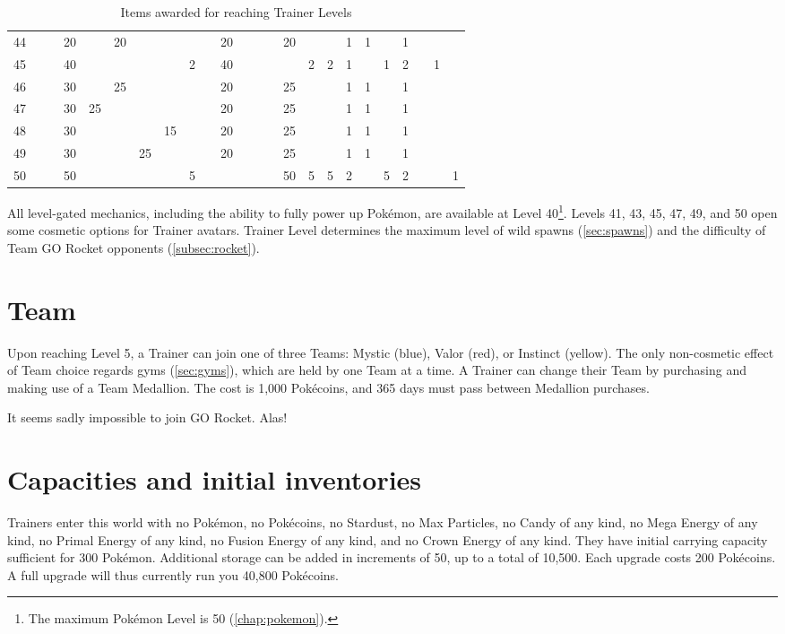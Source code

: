 \begin{table}
\begin{tabular}{r|g c g c g c g c g c g c g c g c g c g c g c g}
  44 &    &    & 20 &    & 20 &    &    &   &    & 20 &    &    &    & 20 &   &   & 1  & 1 &   & 1 &   &   &   \\
  45 &    &    & 40 &    &    &    &    & 2 &    & 40 &    &    &    &    & 2 & 2 & 1  &   & 1 & 2 &   & 1 &   \\
  46 &    &    & 30 &    & 25 &    &    &   &    & 20 &    &    &    & 25 &   &   & 1  & 1 &   & 1 &   &   &   \\
  47 &    &    & 30 & 25 &    &    &    &   &    & 20 &    &    &    & 25 &   &   & 1  & 1 &   & 1 &   &   &   \\
  48 &    &    & 30 &    &    &    & 15 &   &    & 20 &    &    &    & 25 &   &   & 1  & 1 &   & 1 &   &   &   \\
  49 &    &    & 30 &    &    & 25 &    &   &    & 20 &    &    &    & 25 &   &   & 1  & 1 &   & 1 &   &   &   \\
  50 &    &    & 50 &    &    &    &    & 5 &    &    &    &    &    & 50 & 5 & 5 & 2  &   & 5 & 2 &   &   & 1 \\
\end{tabular}
\caption{Items awarded for reaching Trainer Levels\label{table:levelitems}}
\end{table}
All level-gated mechanics, including the ability to fully power up Pokémon,
 are available at Level 40\footnote{The maximum Pokémon Level is 50 (\autoref{chap:pokemon}).}.
Levels 41, 43, 45, 47, 49, and 50 open some cosmetic options for Trainer avatars.
Trainer Level determines the maximum level of wild spawns
  (\autoref{sec:spawns}) and the difficulty of Team GO Rocket
  opponents (\autoref{subsec:rocket}).

\section{Team}
Upon reaching Level 5, a Trainer can join one of three Teams: Mystic (blue),
  Valor (red), or Instinct (yellow).
The only non-cosmetic effect of Team choice regards gyms (\autoref{sec:gyms}), which
  are held by one Team at a time.
A Trainer can change their Team by purchasing and making use of a Team Medallion.
The cost is 1,000 Pokécoins, and 365 days must pass between Medallion purchases.

It seems sadly impossible to join GO Rocket. Alas!

\section{Capacities and initial inventories\label{sec:capacities}}
Trainers enter this world with no Pokémon, no Pokécoins, no Stardust,
  no Max Particles, no Candy of any kind, no Mega Energy of any kind,
  no Primal Energy of any kind, no Fusion Energy of any kind, and no Crown
  Energy of any kind.
They have initial carrying capacity sufficient for 300 Pokémon.
Additional storage can be added in increments of 50, up to a total of 10,500.
Each upgrade costs 200 Pokécoins.
A full upgrade will thus currently run you 40,800 Pokécoins.

